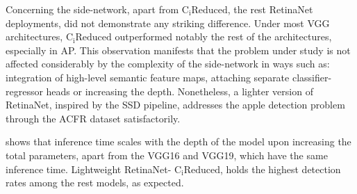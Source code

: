Concerning the side-network, apart from $\text{C}_\text{i}\text{Reduced}$, the rest RetinaNet deployments, did not demonstrate any striking difference. Under most VGG architectures, $\text{C}_\text{i}\text{Reduced}$ outperformed notably the rest of the architectures, especially in AP. This observation manifests that the problem under study is not affected considerably by the complexity of the side-network in ways such as: integration of high-level semantic feature maps, attaching separate classifier-regressor heads or increasing the depth. Nonetheless, a lighter version of RetinaNet, inspired by the SSD pipeline, addresses the apple detection problem through the ACFR dataset satisfactorily.

 shows that inference time scales with the depth of the model upon increasing the total parameters, apart from the VGG16 and VGG19, which have the same inference time. Lightweight RetinaNet- $\text{C}_\text{i}\text{Reduced}$, holds the highest detection rates among the rest models, as expected.


\begin{table}[!htb]
  \centering
  \caption{Inference time for every VGG. Detection rates depend heavily on the No. of parameters of the model and the input resolution. However, the transition from VGG16 to VGG19 did not show any change.}
  \label{tab5}
\end{table}

